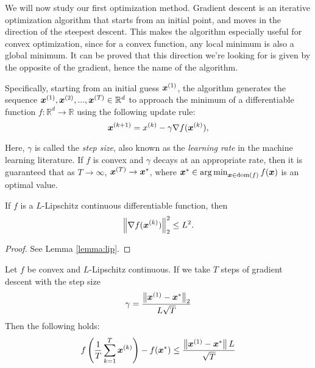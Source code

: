 \documentclass{article}
\DeclareMathOperator*{\argmin}{\arg\min}
\newcommand{\R}{\mathbb{R}}
\begin{document}
We will now study our first optimization method.
Gradient descent is an iterative optimization algorithm that starts from an initial point, and moves in the direction of the steepest descent. 
This makes the algorithm especially useful for convex optimization, since for a convex function, any local minimum is also a global minimum. 
It can be proved that this direction we're looking for is given by the opposite of the gradient, hence the name of the algorithm.

Specifically, starting from an initial guess ${\bm{x}}^{(1)}$, the algorithm generates the sequence ${\bm{x}}^{(1)}, {\bm{x}}^{(2)}, ..., {\bm{x}}^{(T)} \in \mathbb{R}^d$ to approach the minimum of a differentiable function $f:\R^d\to\R$ using the following update rule:
\[
    {\bm{x}}^{(k+1)} = x^{(k)} - \gamma \nabla f({\bm{x}}^{(k)}),
\]

Here, $\gamma$ is called the \emph{step size}, also known as the \emph{learning rate} in the machine learning literature. If $f$ is convex and $\gamma$ decays at an appropriate rate, then it is guaranteed that as $T \to \infty$, ${\bm{x}}^{(T)} \to {\bm{x}}^\ast$, where $\vx^\ast \in \argmin_{\vx\in\dom(f)} f(\vx)$ is an optimal value.

\begin{lemma}
If $f$ is a $L$-Lipschitz continuous differentiable function, then
\[
\left\|\nabla f({\bm{x}}^{(k)})\right\|_2^2 \leq L^2.
\]
\label{lemma:lipschitz}
\end{lemma}
\begin{proof}
See Lemma \ref{lemma:lip}.
\end{proof}
\begin{thm}
Let $f$ be convex and $L$-Lipschitz continuous\footnotemark[6]. If we take $T$ steps of gradient descent with the step size
\[
\gamma = \frac{\left\|{{\bm{x}}}^{(1)} - {{\bm{x}}}^\ast\right\|_2}{L \sqrt{T}}
\]
Then the following holds:
\[
f\left(\frac{1}{T}\sum_{k=1}^T {{\bm{x}}}^{(k)}\right) - f({{\bm{x}}}^\ast) \leq \frac{\left\|{{\bm{x}}}^{(1)} - {{\bm{x}}}^\ast\right\|L}{\sqrt{T}}
\]
\end{thm}
\end{document}
